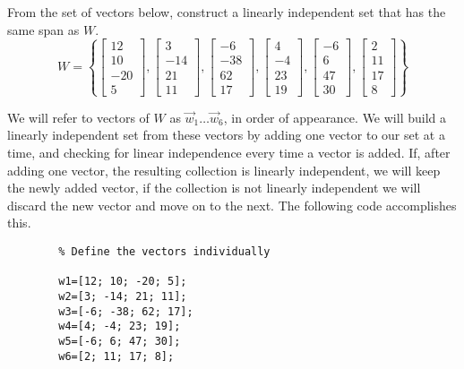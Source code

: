 \documentclass{ximera}
\begin{document}
\begin{example}\label{ex_oct_redundant}
   From the set of vectors below, construct a linearly independent set that has the same span as $W$.
    $$W=\left\{\begin{bmatrix}12\\10\\-20\\5\end{bmatrix}, \begin{bmatrix}3\\-14\\21\\11\end{bmatrix},\begin{bmatrix}-6\\-38\\62\\17\end{bmatrix},\begin{bmatrix}4\\-4\\23\\19\end{bmatrix}, \begin{bmatrix}-6\\6\\47\\30\end{bmatrix}, \begin{bmatrix}2\\11\\17\\8\end{bmatrix}\right\}$$
    \begin{explanation}
        We will refer to vectors of $W$ as $\vec{w}_1\dots\vec{w}_6$, in order of appearance.
        We will build a linearly independent set from these vectors by adding one vector to our set at a time, and checking for linear independence every time a vector is added.  If, after adding one vector, the resulting collection is linearly independent, we will keep the newly added vector, if the collection is not linearly independent we will discard the new vector and move on to the next. The following code accomplishes this.

    \begin{verbatim}
        % Define the vectors individually

        w1=[12; 10; -20; 5];
        w2=[3; -14; 21; 11];
        w3=[-6; -38; 62; 17];
        w4=[4; -4; 23; 19];
        w5=[-6; 6; 47; 30];
        w6=[2; 11; 17; 8];


\end{verbatim}
\end{explanation}
\end{example}
\end{document}
